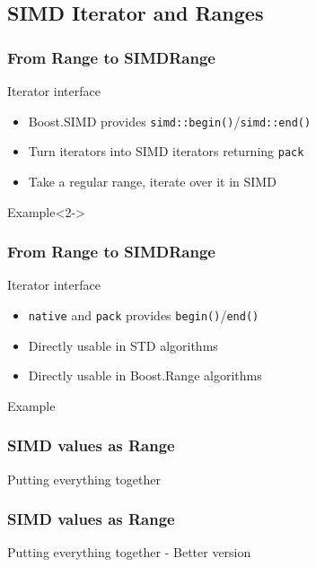 \subsection{SIMD Iterator and Ranges}
\frame
{
  \frametitle{From Range to SIMDRange}
  \begin{block}{Iterator interface}
  \begin{itemize}
  \item Boost.SIMD provides \texttt{simd::begin()}/\texttt{simd::end()}
  \item Turn iterators into SIMD iterators returning \texttt{pack}
  \item Take a regular range, iterate over it in SIMD
  \end{itemize}
  \end{block}

  \begin{block}{Example}<2->
  \begin{center}
  \end{center}
  \end{block}
}

\frame
{
  \frametitle{From Range to SIMDRange}
  \begin{block}{Iterator interface}
  \begin{itemize}
  \item \texttt{native} and \texttt{pack} provides \texttt{begin()}/\texttt{end()}
  \item Directly usable in STD algorithms
  \item Directly usable in Boost.Range algorithms
  \end{itemize}
  \end{block}{}

  \begin{block}{Example}
  \begin{center}
  \lstpackrange
  \end{center}
  \end{block}{}
}

\frame
{
  \frametitle{SIMD values as Range}
  \begin{block}{Putting everything together}
  \begin{center}
  \lstranges
  \end{center}
  \end{block}{}
}

\frame
{
  \frametitle{SIMD values as Range}
  \begin{block}{Putting everything together - Better version}
  \begin{center}
  \lstrangesb
  \end{center}
  \end{block}{}
}

